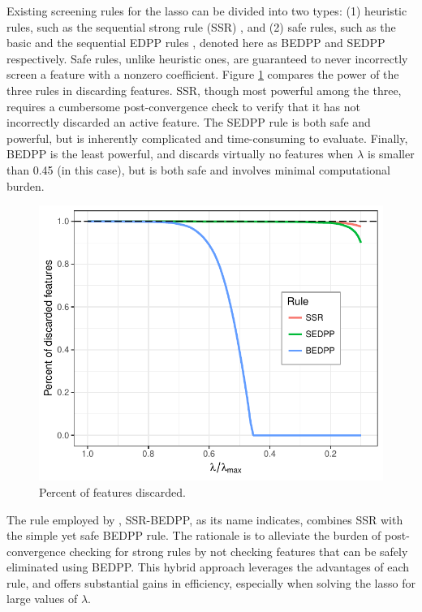 Existing screening rules for the lasso can be divided into two types: (1) heuristic rules, such as the sequential strong rule (SSR) \citep{tibshirani2012strong}, and (2) safe rules, such as the basic and the sequential EDPP rules \citep{JMLR:v16:wang15a}, denoted here as BEDPP and SEDPP respectively. Safe rules, unlike heuristic ones, are guaranteed to never incorrectly screen a feature with a nonzero coefficient.  Figure \ref{fig:rule_compare} compares the power of the three rules in discarding features. SSR, though most powerful among the three, requires a cumbersome post-convergence check to verify that it has not incorrectly discarded an active feature.  The SEDPP rule is both safe and powerful, but is inherently complicated and time-consuming to evaluate. Finally, BEDPP is the least powerful, and discards virtually no features when $\lambda$ is smaller than 0.45 (in this case), but is both safe and involves minimal computational burden.
\begin{figure}[h]
\centering
\includegraphics[scale=0.4]{Figures/Fig_1_three_rules_breast.pdf}
\caption{Percent of features discarded.}
\label{fig:rule_compare}
\end{figure}

The rule employed by , SSR-BEDPP, as its name indicates, combines
SSR with the simple yet safe BEDPP rule. The rationale is to alleviate the
burden of post-convergence checking for strong rules by not checking features
that can be safely eliminated using BEDPP.  This hybrid approach leverages the
advantages of each rule, and offers substantial gains in efficiency,
especially when solving the lasso for large values of $\lambda$.

